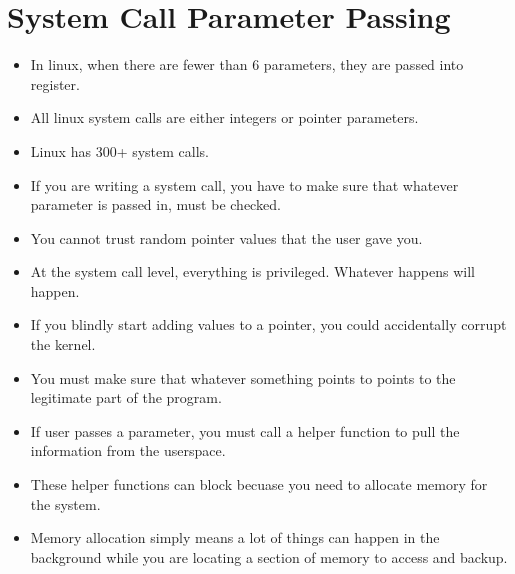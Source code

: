 \documentclass[]{article}
\begin{document}
\section{System Call Parameter Passing}
\begin{itemize}
\item In linux, when there are fewer than 6 parameters, they are passed into
register.
\item All linux system calls are either integers or pointer parameters.
\item Linux has 300+ system calls.
\item If you are writing a system call, you have to make sure that whatever
parameter is passed in, must be checked.
\item You cannot trust random pointer values that the user gave you.
\item At the system call level, everything is privileged. Whatever happens will
happen.
\item If you blindly start adding values to a pointer, you could accidentally
corrupt the kernel.
\item You must make sure that whatever something points to points to the
legitimate part of the program.
\item If user passes a parameter, you must call a helper function to pull the
information from the userspace.
\item These helper functions can block becuase you need to allocate memory for
the system.
\item Memory allocation simply means a lot of things can happen in the
background while you are locating a section of memory to access and backup.
\end{itemize}
\end{document}
